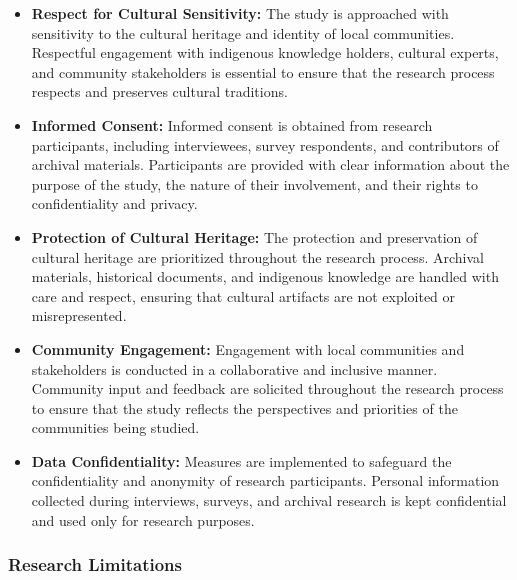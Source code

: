 \begin{itemize}
    \item \textbf{Respect for Cultural Sensitivity:} The study is approached with sensitivity to the cultural heritage and identity of local communities. Respectful engagement with indigenous knowledge holders, cultural experts, and community stakeholders is essential to ensure that the research process respects and preserves cultural traditions.
    
    \item \textbf{Informed Consent:} Informed consent is obtained from research participants, including interviewees, survey respondents, and contributors of archival materials. Participants are provided with clear information about the purpose of the study, the nature of their involvement, and their rights to confidentiality and privacy.
    
    \item \textbf{Protection of Cultural Heritage:} The protection and preservation of cultural heritage are prioritized throughout the research process. Archival materials, historical documents, and indigenous knowledge are handled with care and respect, ensuring that cultural artifacts are not exploited or misrepresented.
    
    \item \textbf{Community Engagement:} Engagement with local communities and stakeholders is conducted in a collaborative and inclusive manner. Community input and feedback are solicited throughout the research process to ensure that the study reflects the perspectives and priorities of the communities being studied.
    
    \item \textbf{Data Confidentiality:} Measures are implemented to safeguard the confidentiality and anonymity of research participants. Personal information collected during interviews, surveys, and archival research is kept confidential and used only for research purposes.
\end{itemize}

\subsubsection{Research Limitations}

